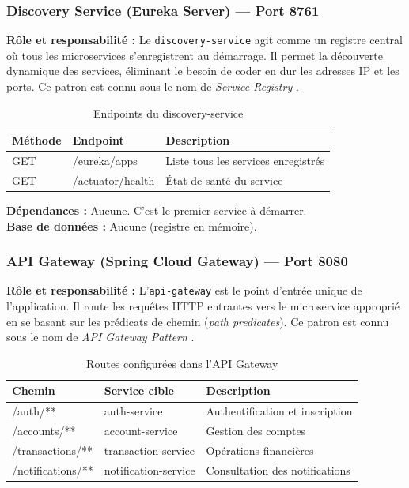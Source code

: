 \documentclass[12pt,a4paper]{article}
\begin{document}
\subsubsection{Discovery Service (Eureka Server) --- Port 8761}

\textbf{Rôle et responsabilité :} Le \texttt{discovery-service} agit comme un registre central où tous les microservices s'enregistrent au démarrage. Il permet la découverte dynamique des services, éliminant le besoin de coder en dur les adresses IP et les ports. Ce patron est connu sous le nom de \textit{Service Registry} \cite{richardson2018}.

\begin{table}[H]
\centering
\caption{Endpoints du discovery-service}
\begin{tabularx}{\textwidth}{|l|l|X|}
\hline
\textbf{Méthode} & \textbf{Endpoint} & \textbf{Description} \\
\hline
GET & /eureka/apps & Liste tous les services enregistrés \\
\hline
GET & /actuator/health & État de santé du service \\
\hline
\end{tabularx}
\end{table}

\textbf{Dépendances :} Aucune. C'est le premier service à démarrer.\\
\textbf{Base de données :} Aucune (registre en mémoire).

\subsubsection{API Gateway (Spring Cloud Gateway) --- Port 8080}

\textbf{Rôle et responsabilité :} L'\texttt{api-gateway} est le point d'entrée unique de l'application. Il route les requêtes HTTP entrantes vers le microservice approprié en se basant sur les prédicats de chemin (\textit{path predicates}). Ce patron est connu sous le nom de \textit{API Gateway Pattern} \cite{richardson2018}.

\begin{table}[H]
\centering
\caption{Routes configurées dans l'API Gateway}
\begin{tabularx}{\textwidth}{|l|l|X|}
\hline
\textbf{Chemin} & \textbf{Service cible} & \textbf{Description} \\
\hline
/auth/** & auth-service & Authentification et inscription \\
\hline
/accounts/** & account-service & Gestion des comptes \\
\hline
/transactions/** & transaction-service & Opérations financières \\
\hline
/notifications/** & notification-service & Consultation des notifications \\
\hline
\end{tabularx}
\end{table}
\end{document}
